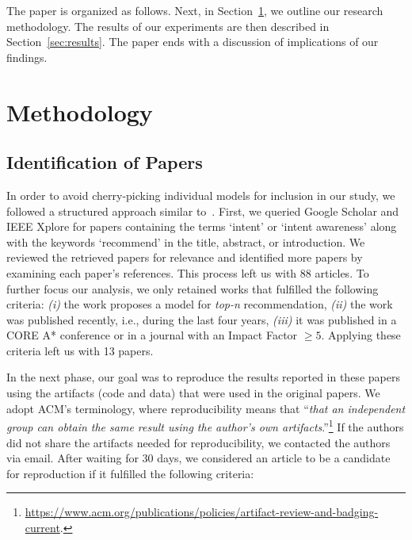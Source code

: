 \documentclass[sigconf,natbib=true,nonacm]{acmart}
\begin{document}
The paper is organized as follows. Next, in Section~\ref{sec:methodology}, we outline our research methodology. The results of our experiments are then described in Section~\ref{sec:results}. The paper ends with a discussion of implications of our findings.

\section{Methodology}
\label{sec:methodology}
\subsection{Identification of Papers}

In order to avoid cherry-picking individual models for inclusion in our study, we followed a structured approach similar to~\cite{ferraridacremaetal2019}. First, we queried Google Scholar and IEEE Xplore for papers containing the terms `intent' or `intent awareness' along with the keywords `recommend' in the title, abstract, or introduction. We reviewed the retrieved papers for relevance and identified more papers by examining each paper's references. This process left us with 88 articles. To further focus our analysis, we only retained works that fulfilled the following criteria: \emph{(i)} the work proposes a model for \emph{top-n} recommendation,
\emph{(ii)} the work was published recently, i.e., during the last four years, \emph{(iii)} it was published in a CORE A* conference or in a journal with an Impact Factor $\geq 5$. Applying these criteria left us with 13 papers.

In the next phase, our goal was to reproduce the results reported in these papers using the artifacts (code and data) that were used in the original papers. We adopt ACM's terminology, where reproducibility means that ``\emph{that an independent group can obtain the same result using the author's own artifacts}.''\footnote{\url{https://www.acm.org/publications/policies/artifact-review-and-badging-current}.} If the authors did not share the artifacts needed for reproducibility, we contacted the authors via email. After waiting for 30 days, we considered
an article to be a candidate for reproduction if it fulfilled the following criteria:
\end{document}
